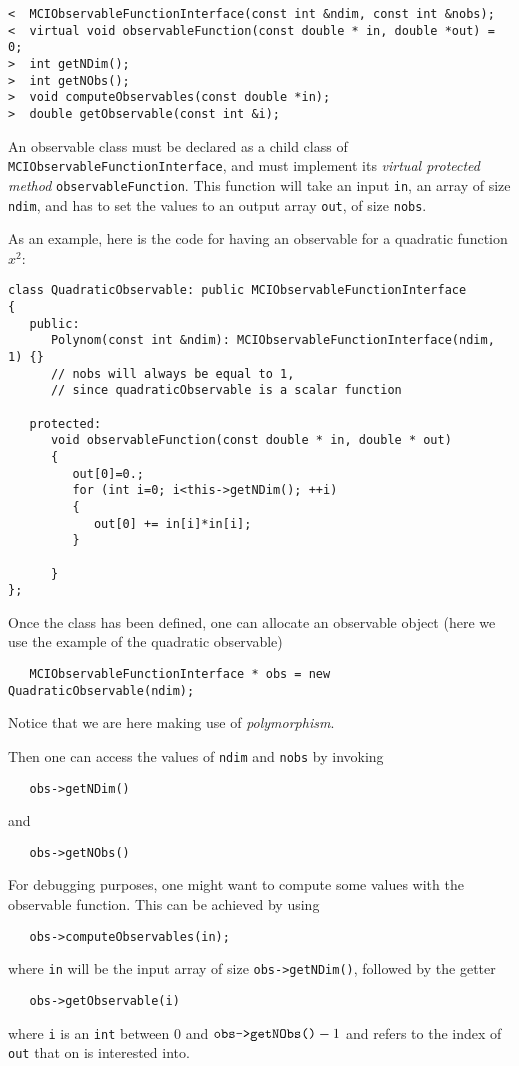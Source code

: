 \documentclass[11pt,a4paper,twoside]{article}
\begin{document}
\begin{verbatim}
<  MCIObservableFunctionInterface(const int &ndim, const int &nobs);
<  virtual void observableFunction(const double * in, double *out) = 0;
>  int getNDim();
>  int getNObs();
>  void computeObservables(const double *in);
>  double getObservable(const int &i);
\end{verbatim}

An observable class must be declared as a child class of \verb+MCIObservableFunctionInterface+, and must implement its \emph{virtual protected method} \verb+observableFunction+.
This function will take an input \verb+in+, an array of size \verb+ndim+, and has to set the values to an output array \verb+out+, of size \verb+nobs+.

As an example, here is the code for having an observable for a quadratic function $x^2$:
\begin{verbatim}
class QuadraticObservable: public MCIObservableFunctionInterface
{
   public:
      Polynom(const int &ndim): MCIObservableFunctionInterface(ndim, 1) {}
      // nobs will always be equal to 1, 
      // since quadraticObservable is a scalar function
      
   protected:
      void observableFunction(const double * in, double * out)
      {
         out[0]=0.;
         for (int i=0; i<this->getNDim(); ++i)
         {
            out[0] += in[i]*in[i];
         }
         
      }
};
\end{verbatim}

Once the class has been defined, one can allocate an observable object (here we use the example of the quadratic observable)
\begin{verbatim}
   MCIObservableFunctionInterface * obs = new QuadraticObservable(ndim);
\end{verbatim}
Notice that we are here making use of \emph{polymorphism}.

Then one can access the values of \verb+ndim+ and \verb+nobs+ by invoking
\begin{verbatim}
   obs->getNDim()
\end{verbatim}
and
\begin{verbatim}
   obs->getNObs()
\end{verbatim}

For debugging purposes, one might want to compute some values with the observable function.
This can be achieved by using
\begin{verbatim}
   obs->computeObservables(in);
\end{verbatim}
where \verb+in+ will be the input array of size \verb+obs->getNDim()+, followed by the getter
\begin{verbatim}
   obs->getObservable(i)
\end{verbatim}
where \verb+i+ is an \verb+int+ between $0$ and $\verb+obs->getNObs()+ - 1$ and refers to the index of \verb+out+ that on is interested into.
\end{document}
